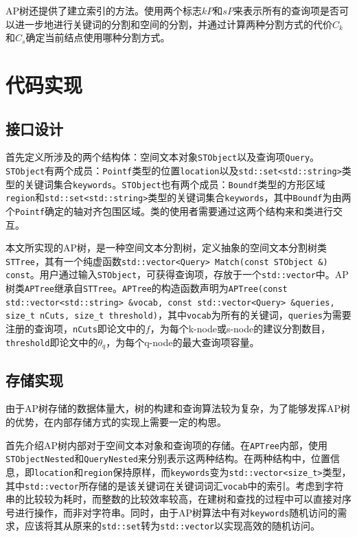 \documentclass[UTF8]{ctexart}
\begin{document}
AP树还提供了建立索引的方法。使用两个标志$kP$和$sP$来表示所有的查询项是否可以进一步地进行关键词的分割和空间的分割，并通过计算两种分割方式的代价$C_k$和$C_s$确定当前结点使用哪种分割方式。


\section{代码实现}

\subsection{接口设计}
首先定义所涉及的两个结构体：空间文本对象\texttt{STObject}以及查询项\texttt{Query}。\texttt{STObject}有两个成员：\texttt{Pointf}类型的位置\texttt{location}以及\texttt{std::set<std::string>}类型的关键词集合\texttt{keywords}。\texttt{STObject}也有两个成员：\texttt{Boundf}类型的方形区域\texttt{region}和\texttt{std::set<std::string>}类型的关键词集合\texttt{keywords}，其中\texttt{Boundf}为由两个\texttt{Pointf}确定的轴对齐包围区域。类的使用者需要通过这两个结构来和类进行交互。

本文所实现的AP树，是一种空间文本分割树，定义抽象的空间文本分割树类\texttt{STTree}，其有一个纯虚函数\texttt{std::vector<Query> Match(const STObject \&) const}。用户通过输入\texttt{STObject}，可获得查询项，存放于一个\texttt{std::vector}中。AP树类\texttt{APTree}继承自\texttt{STTree}。\texttt{APTree}的构造函数声明为\texttt{APTree(const std::vector<std::string> \&vocab, const std::vector<Query> \&queries, size\_t nCuts, size\_t threshold)}，其中\texttt{vocab}为所有的关键词，\texttt{queries}为需要注册的查询项，\texttt{nCuts}即论文中的$f$，为每个k-node或s-node的建议分割数目，\texttt{threshold}即论文中的$\theta_q$，为每个q-node的最大查询项容量。

\subsection{存储实现}
由于AP树存储的数据体量大，树的构建和查询算法较为复杂，为了能够发挥AP树的优势，在内部存储方式的实现上需要一定的构思。

首先介绍AP树内部对于空间文本对象和查询项的存储。在\texttt{APTree}内部，使用\texttt{STObjectNested}和\texttt{QueryNested}来分别表示这两种结构。在两种结构中，位置信息，即\texttt{location}和\texttt{region}保持原样，而\texttt{keywords}变为\texttt{std::vector<size\_t>}类型，其中\texttt{std::vector}所存储的是该关键词在关键词词汇\texttt{vocab}中的索引。考虑到字符串的比较较为耗时，而整数的比较效率较高，在建树和查找的过程中可以直接对序号进行操作，而非对字符串。同时，由于AP树算法中有对\texttt{keywords}随机访问的需求，应该将其从原来的\texttt{std::set}转为\texttt{std::vector}以实现高效的随机访问。
\end{document}
